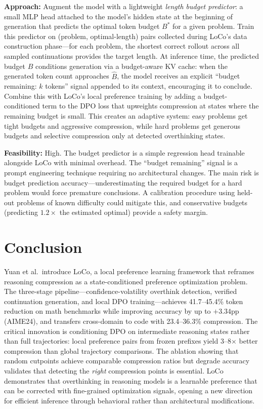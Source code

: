 \documentclass[11pt,a4paper]{article}
\begin{document}
\textbf{Approach:} Augment the model with a lightweight \emph{length budget predictor}: a small MLP head attached to the model's hidden state at the beginning of generation that predicts the optimal token budget $B^*$ for a given problem. Train this predictor on (problem, optimal-length) pairs collected during LoCo's data construction phase---for each problem, the shortest correct rollout across all sampled continuations provides the target length. At inference time, the predicted budget $\hat{B}$ conditions generation via a budget-aware KV cache: when the generated token count approaches $\hat{B}$, the model receives an explicit ``budget remaining: $k$ tokens'' signal appended to its context, encouraging it to conclude. Combine this with LoCo's local preference training by adding a budget-conditioned term to the DPO loss that upweights compression at states where the remaining budget is small. This creates an adaptive system: easy problems get tight budgets and aggressive compression, while hard problems get generous budgets and selective compression only at detected overthinking states.

\textbf{Feasibility:} High. The budget predictor is a simple regression head trainable alongside LoCo with minimal overhead. The ``budget remaining'' signal is a prompt engineering technique requiring no architectural changes. The main risk is budget prediction accuracy---underestimating the required budget for a hard problem would force premature conclusions. A calibration procedure using held-out problems of known difficulty could mitigate this, and conservative budgets (predicting $1.2\times$ the estimated optimal) provide a safety margin.

\section{Conclusion}
Yuan et al.\ introduce LoCo, a local preference learning framework that reframes reasoning compression as a state-conditioned preference optimization problem. The three-stage pipeline---confidence-volatility overthink detection, verified continuation generation, and local DPO training---achieves 41.7--45.4\% token reduction on math benchmarks while improving accuracy by up to $+3.34$pp (AIME24), and transfers cross-domain to code with 23.4--36.3\% compression. The critical innovation is conditioning DPO on intermediate reasoning states rather than full trajectories: local preference pairs from frozen prefixes yield 3--8$\times$ better compression than global trajectory comparisons. The ablation showing that random cutpoints achieve comparable compression ratios but degrade accuracy validates that detecting the \emph{right} compression points is essential. LoCo demonstrates that overthinking in reasoning models is a learnable preference that can be corrected with fine-grained optimization signals, opening a new direction for efficient inference through behavioral rather than architectural modifications.
\end{document}
